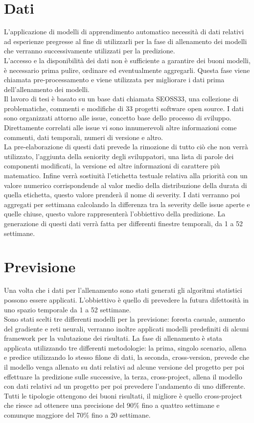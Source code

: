 \documentclass{article}
\begin{document}
\section{Dati}
L'applicazione di modelli di apprendimento automatico necessità di dati relativi ad esperienze pregresse al fine di utilizzarli per la fase di allenamento dei modelli che verranno successivamente utilizzati per la predizione.\\
L'accesso e la disponibilità dei dati non è sufficiente a garantire dei buoni modelli, è necessario prima pulire, ordinare ed eventualmente aggregarli. Questa fase viene chiamata pre-processamento e viene utilizzata per migliorare i dati prima dell'allenamento dei modelli.\\
Il lavoro di tesi è basato su un base dati chiamata SEOSS33, una collezione di problematiche, commenti e modifiche di 33 progetti software open source. I dati sono organizzati attorno alle issue, concetto base dello processo di sviluppo. Direttamente correlati alle issue vi sono innumerevoli altre informazioni come commenti, dati temporali, numeri di versione e altro.\\
La pre-elaborazione di questi dati prevede la rimozione di tutto ciò che non verrà utilizzato, l'aggiunta della seniority degli sviluppatori, una lista di parole dei componenti modificati, la versione ed altre informazioni di carattere più matematico. Infine verrà sostiuità l'etichetta testuale relativa alla priorità con un valore numerico corrispondende al valor medio della distribuzione della durata di quella etichetta, questo valore prenderà il nome di severity. I dati verranno poi aggregati per settimana calcolando la differenza tra la severity delle issue aperte e quelle chiuse, questo valore rappresenterà l'obbiettivo della predizione. La generazione di questi dati verrà fatta per differenti finestre temporali, da 1 a 52 settimane.

\section{Previsione}
Una volta che i dati per l'allenamento sono stati generati gli algoritmi statistici possono essere applicati. L'obbiettivo è quello di prevedere la futura difettosità in uno spazio temporale da 1 a 52 settimane.\\
Sono stati scelti tre differenti modelli per la previsione: foresta casuale, aumento del gradiente e reti neurali, verranno inoltre applicati modelli predefiniti di alcuni framework per la valutazione dei risultati. La fase di allenamento è stata applicata utilizzando tre differenti metodologie: la prima, singolo scenario, allena e predice utilizzando lo stesso filone di dati, la seconda, cross-version, prevede che il modello venga allenato su dati relativi ad alcune versione del progetto per poi effettuare la predizione sulle successive, la terza, cross-project, allena il modello con dati relativi ad un progetto per poi prevedere l'andamento di uno differente.\\
Tutti le tipologie ottengono dei buoni risultati, il migliore è quello cross-project che riesce ad ottenere una precisione del 90\% fino a quattro settimane e comunque maggiore del 70\% fino a 20 settimane. 
\end{document}
